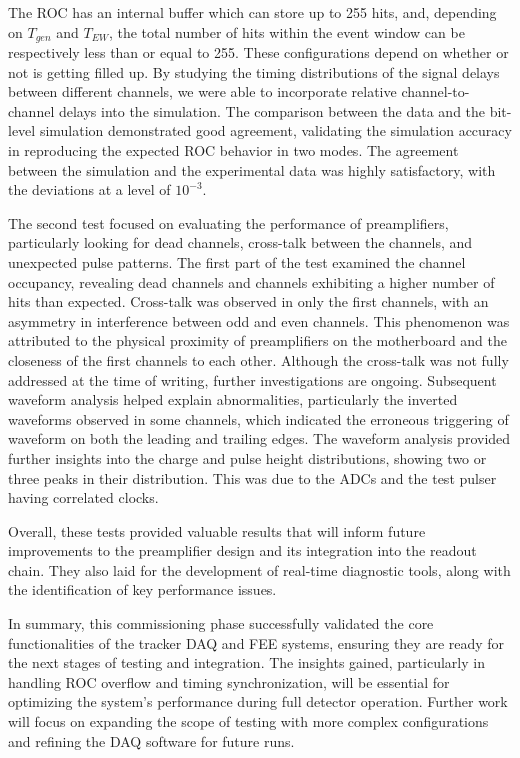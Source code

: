 The ROC has an internal buffer which can store up to 255 hits, 
and, depending on \( T_{gen} \) and \( T_{EW} \), 
the total number of hits within the event window 
can be respectively less than or equal to 255. 
These configurations depend on whether or not 
is getting filled up.
By studying the timing distributions of the signal delays 
between different channels, we 
were able to incorporate relative channel-to-channel delays into 
the simulation. The comparison 
between the data and the bit-level simulation 
demonstrated good agreement, 
validating the simulation accuracy in reproducing 
the expected ROC behavior in   
two modes. The agreement between 
the simulation and the experimental data was highly satisfactory,
with the deviations at a level of \( 10^{-3} \).

The second test focused on evaluating the 
performance of preamplifiers, 
particularly looking for dead channels, 
cross-talk between the channels, 
and unexpected pulse patterns. The first part 
of the test examined the channel occupancy, revealing 
dead channels and channels exhibiting a higher 
number of hits than expected. 
Cross-talk was observed in only the first channels, 
with an asymmetry in interference 
between odd and even channels. This phenomenon was 
attributed to the physical proximity 
of preamplifiers on the motherboard and the 
closeness of the first channels to each other. 
Although the cross-talk was not fully addressed at 
the time of writing, further investigations 
are ongoing. Subsequent waveform analysis helped explain 
abnormalities, particularly the inverted 
waveforms observed in some channels, which indicated 
the erroneous triggering of waveform 
on both the leading and trailing edges. The 
waveform analysis 
provided further insights into the charge and 
pulse height distributions, showing two or 
three peaks in their distribution. This was due 
to the ADCs and the test pulser having 
correlated clocks. 

Overall, these tests provided valuable results 
that will inform future improvements to the 
preamplifier design and its integration into 
the readout chain. They also laid 
for the development of real-time 
diagnostic tools, along with the identification of 
key performance issues.

In summary, this commissioning phase successfully validated 
the core functionalities 
of the tracker DAQ and FEE systems, ensuring they are ready 
for the next stages of 
testing and integration. The insights gained, particularly 
in handling ROC overflow 
and timing synchronization, will be essential for optimizing 
the system's performance 
during full detector operation. Further work will focus on 
expanding the scope of 
testing with more complex configurations and refining the 
DAQ software for future runs.


